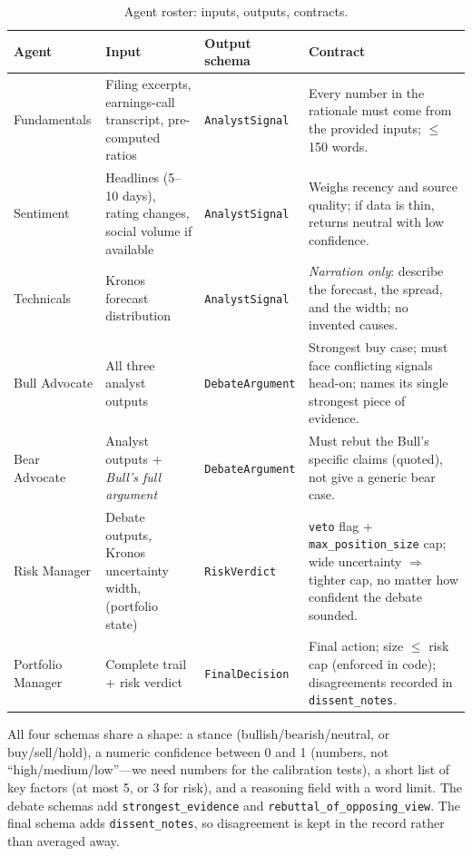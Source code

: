 \documentclass[conference]{IEEEtran}
\begin{document}
\begin{table}[!t]
\centering
\caption{Agent roster: inputs, outputs, contracts.}
\label{tab:roster}
\small
\begin{tabularx}{\columnwidth}{L{1.35cm} L{1.7cm} L{1.55cm} X}
\toprule
\textbf{Agent} & \textbf{Input} & \textbf{Output schema} & \textbf{Contract} \\
\midrule
Fundamentals & Filing excerpts, earnings-call transcript, pre-computed ratios & \texttt{AnalystSignal} & Every number in the rationale must come from the provided inputs; $\le$150 words. \\
\addlinespace[2pt]
Sentiment & Headlines (5--10 days), rating changes, social volume if available & \texttt{AnalystSignal} & Weighs recency and source quality; if data is thin, returns neutral with low confidence. \\
\addlinespace[2pt]
Technicals & Kronos forecast distribution & \texttt{AnalystSignal} & \emph{Narration only}: describe the forecast, the spread, and the width; no invented causes. \\
\addlinespace[2pt]
Bull Advocate & All three analyst outputs & \texttt{DebateArgument} & Strongest buy case; must face conflicting signals head-on; names its single strongest piece of evidence. \\
\addlinespace[2pt]
Bear Advocate & Analyst outputs + \emph{Bull's full argument} & \texttt{DebateArgument} & Must rebut the Bull's specific claims (quoted), not give a generic bear case. \\
\addlinespace[2pt]
Risk Manager & Debate outputs, Kronos uncertainty width, (portfolio state) & \texttt{RiskVerdict} & \texttt{veto} flag + \texttt{max\_position\_size} cap; wide uncertainty $\Rightarrow$ tighter cap, no matter how confident the debate sounded. \\
\addlinespace[2pt]
Portfolio Manager & Complete trail + risk verdict & \texttt{FinalDecision} & Final action; size $\le$ risk cap (enforced in code); disagreements recorded in \texttt{dissent\_notes}. \\
\bottomrule
\end{tabularx}
\end{table}

All four schemas share a shape: a stance (bullish/bearish/neutral, or buy/sell/hold), a numeric confidence between 0 and 1 (numbers, not ``high/medium/low''---we need numbers for the calibration tests), a short list of key factors (at most 5, or 3 for risk), and a reasoning field with a word limit. The debate schemas add \texttt{strongest\_evidence} and \texttt{rebuttal\_of\_opposing\_view}. The final schema adds \texttt{dissent\_notes}, so disagreement is kept in the record rather than averaged away.
\end{document}

